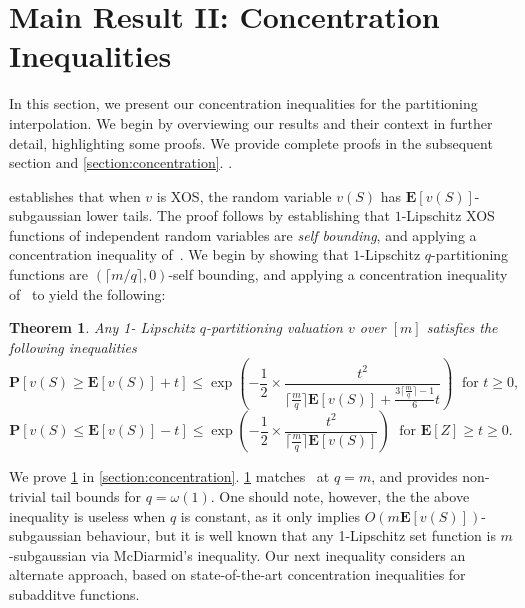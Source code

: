 \documentclass[11pt]{article}%
\newtheorem{theorem}{Theorem}
\numberwithin{theorem}{subsection}
\newcommand{\prob}{\mathbf{P}}
\newcommand{\expect}{\mathbf{E}}
\begin{document}
\section{Main Result II: Concentration Inequalities}
\label{section:introconcentration}

In this section, we present our concentration inequalities for the partitioning interpolation. We begin by overviewing our results and their context in further detail, highlighting some proofs. We provide complete proofs in the subsequent section and 
\cref{section:concentration}.
.

\cite{Vondrak10} establishes that when $v$ is XOS, the random variable $v(S)$ has $\expect[v(S)]$-subgaussian lower tails. The proof follows by establishing that $1$-Lipschitz XOS functions of independent random variables are \emph{self bounding}, and applying a concentration inequality of~\cite{BoucheronLM00}. We begin by showing that $1$-Lipschitz $q$-partitioning functions are $(\lceil m/q\rceil,0)$-self bounding, and applying a concentration inequality of~\cite{McDiarmidR06,BoucheronLM09} to yield the following:

\begin{theorem}
\label{thm:selfboundingqpart}
Any 1- Lipschitz $q$-partitioning valuation $v$ over $[m]$ satisfies the following inequalities
$$
\prob\left[v(S)\ge \expect[v(S)] + t\right]\le
\exp\left(-\frac{1}{2}\times\frac{t^2}{\lceil\frac{m}{q}\rceil \expect[v(S)] + \frac{3\lceil \frac{m}{q}\rceil-1}{6}t}\right)\;\text { for }t\ge 0,
$$
$$
\prob[v(S)\le \expect[v(S)] - t]\le
\exp\left(-\frac{1}{2}\times\frac{t^2}{\lceil\frac{m}{q}\rceil \expect[v(S)]}\right)\;\text{ for }\expect[Z]\ge t\ge 0.
$$
\end{theorem}

We prove \cref{thm:selfboundingqpart} in \cref{section:concentration}. \cref{thm:selfboundingqpart} matches~\cite{Vondrak10} at $q=m$, and provides non-trivial tail bounds for $q = \omega(1)$. One should note, however, the the above inequality is useless when $q$ is constant, as it only implies $O(m\expect[v(S)])$-subgaussian behaviour, but it is well known that any 1-Lipschitz set function is $m$-subgaussian via McDiarmid's inequality. Our next inequality considers an alternate approach, based on state-of-the-art concentration inequalities for subadditve functions.\\
\end{document}
